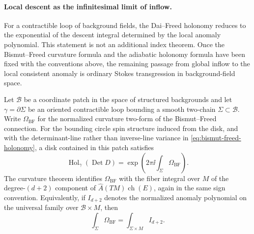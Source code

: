 \paragraph{Local descent as the infinitesimal limit of inflow.}
For a contractible loop of background fields, the Dai--Freed holonomy reduces
to the exponential of the descent integral determined by the local anomaly
polynomial.  This statement is not an additional index theorem.  Once the
Bismut--Freed curvature formula and the adiabatic holonomy formula have been
fixed with the conventions above, the remaining passage from global inflow to
the local consistent anomaly is ordinary Stokes transgression in
background-field space.

Let \(\mathcal B\) be a coordinate patch in the space of structured
backgrounds and let \(\gamma=\partial\Sigma\) be an oriented contractible loop
bounding a smooth two-chain \(\Sigma\subset\mathcal B\).  Write
\(\Omega_{\mathrm{BF}}\) for the normalized curvature two-form of the
Bismut--Freed connection.  For the bounding circle spin structure induced
from the disk, and with the determinant-line rather than inverse-line
variance in \eqref{eq:bismut-freed-holonomy}, a disk contained in this patch
satisfies
\begin{equation}
  \operatorname{Hol}_{\gamma}(\operatorname{Det}D)
  =
  \exp\!\left(
    2\pi\ii\int_{\Sigma}\Omega_{\mathrm{BF}}
  \right).
  \label{eq:bf-contractible-loop-stokes}
\end{equation}
The curvature theorem identifies \(\Omega_{\mathrm{BF}}\) with the fiber
integral over \(M\) of the degree-\((d+2)\) component of
\(\widehat A(TM)\operatorname{ch}(E)\), again in the same sign convention.
Equivalently, if \(I_{d+2}\) denotes the normalized anomaly polynomial on
the universal family over \(\mathcal B\times M\), then
\begin{equation}
  \int_\Sigma \Omega_{\mathrm{BF}}
  =
  \int_{\Sigma\times M} I_{d+2}.
  \label{eq:bf-curvature-family-index-integral}
\end{equation}

